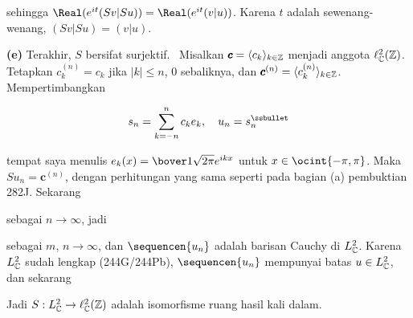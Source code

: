 {\noindent sehingga $\Real(e^{it}(Sv|Su))=\Real(e^{it}(v|u))$.   Karena $t$ adalah
sewenang-wenang, $(Sv|Su)=(v|u)$.   \Qed

\medskip

{\bf (e)}    Terakhir, $S$ bersifat surjektif.   \Prf\ Misalkan
$\pmb{c}=\langle c_k\rangle_{k\in\Bbb Z}$ menjadi anggota
$\ell_{\Bbb C}^2(\Bbb Z)$.   Tetapkan
$c^{(n)}_k=c_k$ jika $|k|\le n$, $0$ sebaliknya, dan
$\pmb{c}^{(n)}=\langle c^{(n)}_k\rangle_{k\in\Bbb Z}$.   Mempertimbangkan

$$s_n=\sum_{k=-n}^nc_ke_k,\quad u_n=s_n^{\ssbullet}$$

\noindent tempat saya menulis $e_k(x)=\bover1{\sqrt{2\pi}}e^{ikx}$ untuk
$x\in\ocint{-\pi,\pi}$.   Maka $Su_n=\pmb{c}^{(n)}$, dengan perhitungan
yang sama seperti pada bagian (a) pembuktian 282J.   Sekarang


\noindent sebagai $n\to\infty$, jadi


\noindent sebagai $m$, $n\to\infty$, dan $\sequencen{u_n}$ adalah barisan Cauchy
di $L_{\Bbb C}^2$.   Karena $L_{\Bbb C}^2$ sudah lengkap
(244G/244Pb), $\sequencen{u_n}$ mempunyai batas $u\in L_{\Bbb C}^2$, dan sekarang


Jadi $S:L_{\Bbb C}^2\to\ell_{\Bbb C}^2(\Bbb Z)$ adalah isomorfisme ruang hasil kali dalam.
}%

